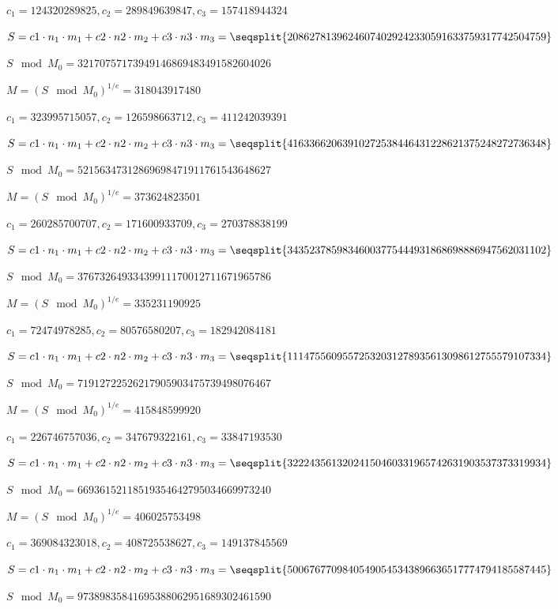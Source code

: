 $c_1=124320289825, c_2=289849639847, c_3=157418944324$

$S = c1 \cdot n_1 \cdot m_1 + c2 \cdot n2 \cdot m_2 + c3 \cdot n3 \cdot m_3 = \seqsplit{20862781396246074029242330591633759317742504759}$

$S \mod{M_0} = 32170757173949146869483491582604026$

$M = (S \mod{M_0})^{1/e} = 318043917480$


$c_1=323995715057, c_2=126598663712, c_3=411242039391$

$S = c1 \cdot n_1 \cdot m_1 + c2 \cdot n2 \cdot m_2 + c3 \cdot n3 \cdot m_3 = \seqsplit{41633662063910272538446431228621375248272736348}$

$S \mod{M_0} = 52156347312869698471911761543648627$

$M = (S \mod{M_0})^{1/e} = 373624823501$


$c_1=260285700707, c_2=171600933709, c_3=270378838199$

$S = c1 \cdot n_1 \cdot m_1 + c2 \cdot n2 \cdot m_2 + c3 \cdot n3 \cdot m_3 = \seqsplit{34352378598346003775444931868698886947562031102}$

$S \mod{M_0} = 37673264933439911170012711671965786$

$M = (S \mod{M_0})^{1/e} = 335231190925$


$c_1=72474978285, c_2=80576580207, c_3=182942084181$

$S = c1 \cdot n_1 \cdot m_1 + c2 \cdot n2 \cdot m_2 + c3 \cdot n3 \cdot m_3 = \seqsplit{11147556095572532031278935613098612755579107334}$

$S \mod{M_0} = 71912722526217905903475739498076467$

$M = (S \mod{M_0})^{1/e} = 415848599920$


$c_1=226746757036, c_2=347679322161, c_3=33847193530$

$S = c1 \cdot n_1 \cdot m_1 + c2 \cdot n2 \cdot m_2 + c3 \cdot n3 \cdot m_3 = \seqsplit{32224356132024150460331965742631903537373319934}$

$S \mod{M_0} = 66936152118519354642795034669973240$

$M = (S \mod{M_0})^{1/e} = 406025753498$


$c_1=369084323018, c_2=408725538627, c_3=149137845569$

$S = c1 \cdot n_1 \cdot m_1 + c2 \cdot n2 \cdot m_2 + c3 \cdot n3 \cdot m_3 = \seqsplit{50067677098405490545343896636517774794185587445}$

$S \mod{M_0} = 97389835841695388062951689302461590$

